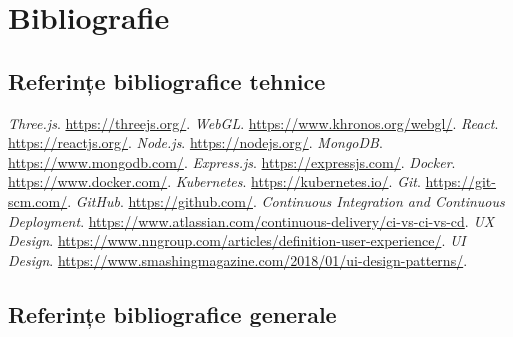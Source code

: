 \chapter{Bibliografie}
\label{chapter:bibliografie}

\section{Referințe bibliografice tehnice}
\label{sec:bibliografie-referinte}

\begin{thebibliography}{9}
\textit{Three.js}. \url{https://threejs.org/}.
\textit{WebGL}. \url{https://www.khronos.org/webgl/}.
\textit{React}. \url{https://reactjs.org/}.
\textit{Node.js}. \url{https://nodejs.org/}.
\textit{MongoDB}. \url{https://www.mongodb.com/}.
\textit{Express.js}. \url{https://expressjs.com/}.
\textit{Docker}. \url{https://www.docker.com/}.
\textit{Kubernetes}. \url{https://kubernetes.io/}.
\textit{Git}. \url{https://git-scm.com/}.
\textit{GitHub}. \url{https://github.com/}.
\textit{Continuous Integration and Continuous Deployment}. \url{https://www.atlassian.com/continuous-delivery/ci-vs-ci-vs-cd}.
\textit{UX Design}. \url{https://www.nngroup.com/articles/definition-user-experience/}.
\textit{UI Design}. \url{https://www.smashingmagazine.com/2018/01/ui-design-patterns/}.
\end{thebibliography}

\section{Referințe bibliografice generale}
\label{sec:bibliografie-generale}

